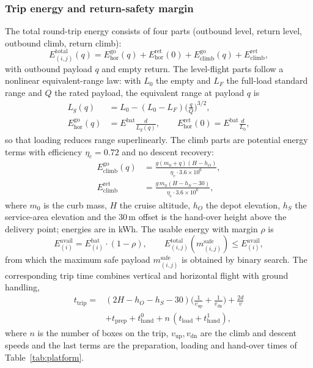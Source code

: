 \documentclass[journal]{IEEEtran}
\begin{document}
\subsubsection{Trip energy and return-safety margin}
The total round-trip energy consists of four parts (outbound level, return
level, outbound climb, return climb):
\begin{equation}
E^{\mathrm{total}}_{(i,j)}(q)=E^{\mathrm{go}}_{\mathrm{hor}}(q)+E^{\mathrm{ret}}_{\mathrm{hor}}(0)
+E^{\mathrm{go}}_{\mathrm{climb}}(q)+E^{\mathrm{ret}}_{\mathrm{climb}},
\end{equation}
with outbound payload $q$ and empty return. The level-flight parts follow a
nonlinear equivalent-range law: with $L_0$ the empty and $L_F$ the full-load
standard range and $Q$ the rated payload, the equivalent range at payload $q$
is
\begin{align}
L_g(q)&=L_0-(L_0-L_F)\Big(\frac{q}{Q}\Big)^{3/2},\\
E^{\mathrm{go}}_{\mathrm{hor}}(q)&=E^{\mathrm{bat}}\frac{d}{L_g(q)},\qquad
E^{\mathrm{ret}}_{\mathrm{hor}}(0)=E^{\mathrm{bat}}\frac{d}{L_0},
\end{align}
so that loading reduces range superlinearly. The climb parts are potential
energy terms with efficiency $\eta_c=0.72$ and no descent recovery:
\begin{align}
E^{\mathrm{go}}_{\mathrm{climb}}(q)&=\frac{g(m_0+q)(H-h_O)}{\eta_c\cdot3.6\times10^{6}},\\
E^{\mathrm{ret}}_{\mathrm{climb}}&=\frac{g\,m_0(H-h_S-30)}{\eta_c\cdot3.6\times10^{6}},
\end{align}
where $m_0$ is the curb mass, $H$ the cruise altitude, $h_O$ the depot
elevation, $h_S$ the service-area elevation and the $30$\,m offset is the
hand-over height above the delivery point; energies are in kWh. The usable
energy with margin $\rho$ is
\begin{equation}
E^{\mathrm{avail}}_{(i)}=E^{\mathrm{bat}}_{(i)}\cdot(1-\rho),
\qquad
E^{\mathrm{total}}_{(i,j)}(m^{\mathrm{safe}}_{(i,j)})\le E^{\mathrm{avail}}_{(i)} ,
\end{equation}
from which the maximum safe payload $m^{\mathrm{safe}}_{(i,j)}$ is obtained by
binary search. The corresponding trip time combines vertical and horizontal
flight with ground handling,
\begin{equation}
\begin{split}
t_{\mathrm{trip}}={}&(2H-h_O-h_S-30)\Big(\frac{1}{v_{\mathrm{up}}}+\frac{1}{v_{\mathrm{dn}}}\Big)
+\frac{2d}{v}\\
&+t_{\mathrm{prep}}+t^{0}_{\mathrm{hand}}
+n\,(t_{\mathrm{load}}+t^{1}_{\mathrm{hand}}),
\end{split}
\end{equation}
where $n$ is the number of boxes on the trip, $v_{\mathrm{up}},v_{\mathrm{dn}}$
are the climb and descent speeds and the last terms are the preparation,
loading and hand-over times of Table~\ref{tab:platform}.
\end{document}
